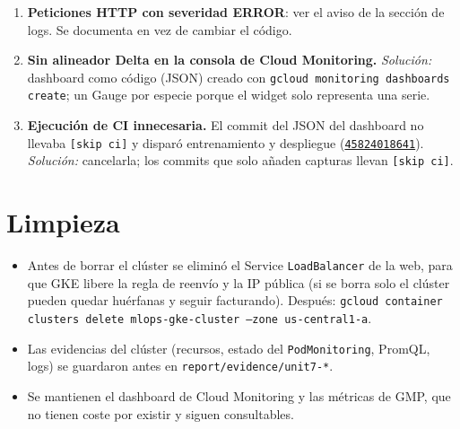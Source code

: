 \documentclass[11pt,a4paper]{article}
\newcommand{\code}[1]{\texttt{#1}}
\newcommand{\run}[1]{\href{https://github.com/JES0406/mlops-practica-icai/actions/runs/#1}{\code{#1}}}
\begin{document}
\begin{enumerate}[label=\textbf{D\arabic*.}, ref=D\arabic*, leftmargin=2.4em, itemsep=0.5em]
\item \textbf{Peticiones HTTP con severidad ERROR}: ver el aviso de la sección de logs.
  Se documenta en vez de cambiar el código.

\item \textbf{Sin alineador Delta en la consola de Cloud Monitoring.}
  \emph{Solución:} dashboard como código (JSON) creado con
  \code{gcloud monitoring dashboards create}; un Gauge por especie porque el widget solo
  representa una serie.

\item \textbf{Ejecución de CI innecesaria.} El commit del JSON del dashboard no llevaba
  \code{[skip ci]} y disparó entrenamiento y despliegue (\run{45824018641}).
  \emph{Solución:} cancelarla; los commits que solo añaden capturas llevan \code{[skip ci]}.

\end{enumerate}

\section{Limpieza}
\begin{itemize}[nosep]
  \item Antes de borrar el clúster se eliminó el Service \code{LoadBalancer} de la web, para
        que GKE libere la regla de reenvío y la IP pública (si se borra solo el clúster
        pueden quedar huérfanas y seguir facturando). Después:
        \code{gcloud container clusters delete mlops-gke-cluster --zone us-central1-a}.
  \item Las evidencias del clúster (recursos, estado del \code{PodMonitoring}, PromQL, logs)
        se guardaron antes en \code{report/evidence/unit7-*}.
  \item Se mantienen el dashboard de Cloud Monitoring y las métricas de GMP, que no tienen
        coste por existir y siguen consultables.
\end{itemize}

\end{document}
